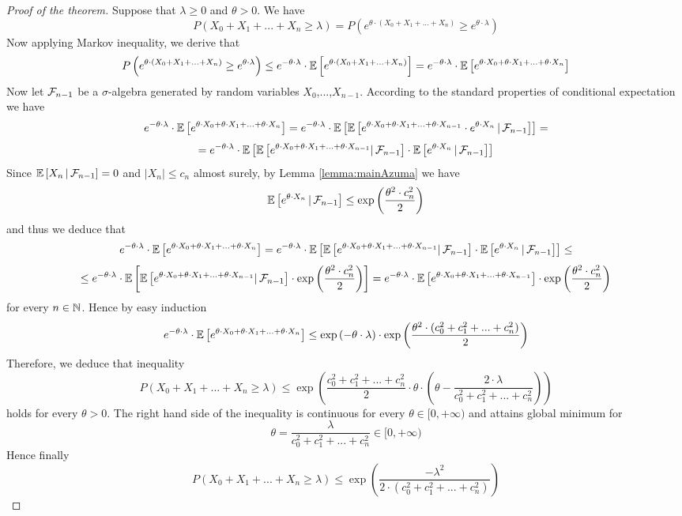 \begin{proof}[Proof of the theorem]
Suppose that $\lambda \geq 0$ and $\theta > 0$. We have
$$P\left(X_0+X_1+...+X_n\geq \lambda\right) = P\left(e^{\theta \cdot \left(X_0+X_1+...+X_n\right)}\geq e^{\theta \cdot \lambda}\right)$$
Now applying Markov inequality, we derive that
$$P\left(e^{\theta \cdot \left(X_0+X_1+...+X_n\right)}\geq e^{\theta \cdot \lambda}\right)\leq e^{-\theta\cdot \lambda}\cdot {\mathbb E} \left[e^{\theta \cdot \left(X_0+X_1+...+X_n\right)}\right] = e^{-\theta\cdot \lambda}\cdot {\mathbb E}\left[e^{\theta \cdot X_0+\theta \cdot X_1+...+\theta \cdot X_n}\right]$$
Now let ${\mathcal F}_{n-1}$ be a $\sigma$-algebra generated by random variables $X_0$,...,$X_{n-1}$. According to the standard properties of conditional expectation we have
$$e^{-\theta\cdot \lambda}\cdot {\mathbb E}\left[e^{\theta \cdot X_0+\theta \cdot X_1+...+\theta \cdot X_n}\right] = e^{-\theta\cdot \lambda}\cdot {\mathbb E}\left[{\mathbb E}\left[e^{\theta \cdot X_0+\theta \cdot X_1+...+\theta \cdot X_{n-1}}\cdot e^{\theta \cdot X_n}\,|\,{\mathcal F}_{n-1}\right]\right]=$$
$$=e^{-\theta\cdot \lambda}\cdot {\mathbb E}\left[{\mathbb E}\left[e^{\theta \cdot X_0+\theta \cdot X_1+...+\theta \cdot X_{n-1}}|\,{\mathcal F}_{n-1}\right] \cdot {\mathbb E}\left[ e^{\theta \cdot X_n}\,|\,{\mathcal F}_{n-1}\right]\right]$$
Since ${\mathbb E}\left[X_n\,|\,{\mathcal F}_{n-1}\right] = 0$ and $|X_n|\leq c_n$ almost surely, by Lemma \ref{lemma:mainAzuma} we have
$${\mathbb E}\left[ e^{\theta \cdot X_n}\,|\,{\mathcal F}_{n-1}\right] \leq  \exp\left(\frac{\theta^2\cdot c_n^2}{2}\right)$$
and thus we deduce that
$$e^{-\theta\cdot \lambda}\cdot {\mathbb E}\left[e^{\theta \cdot X_0+\theta \cdot X_1+...+\theta \cdot X_n}\right] = e^{-\theta\cdot \lambda}\cdot {\mathbb E}\left[{\mathbb E}\left[e^{\theta \cdot X_0+\theta \cdot X_1+...+\theta \cdot X_{n-1}}|\,{\mathcal F}_{n-1}\right] \cdot {\mathbb E}\left[ e^{\theta \cdot X_n}\,|\,{\mathcal F}_{n-1}\right]\right] \leq$$
$$\leq  e^{-\theta\cdot \lambda}\cdot {\mathbb E}\left[{\mathbb E}\left[e^{\theta \cdot X_0+\theta \cdot X_1+...+\theta \cdot X_{n-1}}|\,{\mathcal F}_{n-1}\right] \cdot \exp\left(\frac{\theta^2\cdot c_n^2}{2}\right)\right]=e^{-\theta\cdot \lambda}\cdot {\mathbb E} \left[e^{\theta \cdot X_0+\theta \cdot X_1+...+\theta \cdot X_{n-1}}\right] \cdot \exp\left(\frac{\theta^2\cdot c_n^2}{2}\right)$$
for every $n\in {\mathbb N}$. Hence by easy induction
$$e^{-\theta\cdot \lambda}\cdot {\mathbb E}\left[e^{\theta \cdot X_0+\theta \cdot X_1+...+\theta \cdot X_n}\right]\leq \exp\left(-\theta \cdot \lambda\right)\cdot \exp\left(\frac{\theta^2\cdot (c_0^2+c_1^2+...+c_n^2)}{2}\right)$$
Therefore, we deduce that inequality
$$P\left(X_0+X_1+...+X_n\geq \lambda\right)\leq \exp\left(\frac{c_0^2+c_1^2+...+c_n^2}{2}\cdot \theta \cdot \left(\theta - \frac{2\cdot \lambda}{c_0^2+c_1^2+...+c_n^2} \right)\right)$$
holds for every $\theta>0$. The right hand side of the inequality is continuous for every $\theta \in [0,+\infty)$ and attains global minimum for 
$$\theta = \frac{\lambda}{c_0^2+c_1^2+...+c_n^2}\in [0,+\infty)$$
Hence finally 
$$P\left(X_0+X_1+...+X_n\geq \lambda\right)\leq  \exp\left(\frac{-\lambda^2}{2\cdot \left(c_0^2+c_1^2+...+c^2_n\right)}\right)$$
\end{proof}

